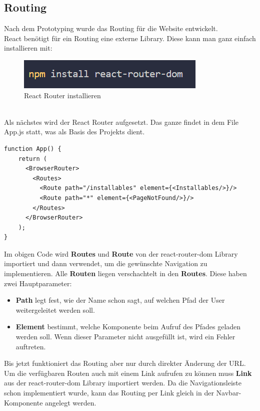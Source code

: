 \subsection{Routing}
Nach dem Prototyping wurde das Routing für die Website entwickelt.
\\
React benötigt für ein Routing eine externe Library. Diese kann man ganz einfach installieren mit: 
\begin{figure}[ht!]
  \centering
  \includegraphics[scale=1]{pics/react-router.PNG}
  \caption{\label{fig:The-caption}React Router installieren }
  \label{fig:impl:use-case-diagramm}
\end{figure}
\\
Als nächstes wird der React Router aufgesetzt. Das ganze findet in dem File App.js statt, was als Basis des Projekts dient.


\begin{lstlisting}[caption=Routen in React]
  function App() {
    return (
      <BrowserRouter>
        <Routes>
          <Route path="/installables" element={<Installables/>}/>
          <Route path="*" element={<PageNotFound/>}/>
        </Routes>
      </BrowserRouter>
    );
}
\end{lstlisting}


Im obigen Code wird \textbf{Routes} und \textbf{Route} von der react-router-dom Library importiert und dann verwendet, um 
die gewünschte Navigation zu implementieren. Alle \textbf{Routen} liegen verschachtelt in den \textbf{Routes}.
Diese haben zwei Hauptparameter:
\begin{itemize}
  \item {\textbf{Path} legt fest, wie der Name schon sagt, auf welchen Pfad der User weitergeleitet werden soll.}
  \item {\textbf{Element} bestimmt, welche Komponente beim Aufruf des Pfades geladen werden soll. Wenn dieser Parameter 
  nicht ausgefüllt ist, wird ein Fehler auftreten.}
\end{itemize}
\newpage
Bis jetzt funktioniert das Routing aber nur durch direkter Änderung der URL. Um die verfügbaren Routen auch mit einem Link 
aufrufen zu können muss \textbf{Link} aus der react-router-dom Library importiert werden. 
Da die Navigationsleiste schon implementiert wurde, kann das Routing per Link gleich in der Navbar-Komponente angelegt werden.

